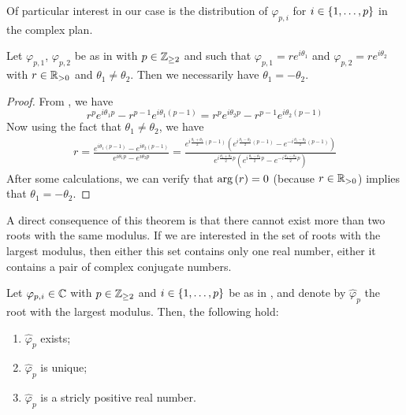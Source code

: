 \documentclass{article}
\begin{document}

    Of particular interest in our case is the distribution of $\varphi_{p, i}$ for $i \in \{1, \dots, p\}$ in the complex plan.

    \begin{theorem} \label{thm:one_two_rule}
      Let $\varphi_{p,1}$, $\varphi_{p,2}$ be as in  with $p \in \mathbb{Z}_{\geq 2}$ and such that
      $\varphi_{p,1} = r e^{i\theta_1}$ and $\varphi_{p,2} = r e^{i\theta_2}$ with $r \in \mathbb{R}_{>0}$ and $\theta_1 \neq \theta_2$. 
      Then we necessarily have $\theta_{1} = - \theta_{2}$.
    \end{theorem}

    \begin{proof}
      From , we have
      \begin{equation}
        r^p e^{i\theta_1p} - r^{p-1} e^{i\theta_1(p-1)}
        = r^p e^{i\theta_2p} - r^{p-1} e^{i\theta_2(p-1)}
      \end{equation}
      Now using the fact that $\theta_1 \neq \theta_2$, we have
      \begin{align}
        r = \frac{e^{i \theta_1 (p-1)} - e^{i \theta_2 (p-1)}}{e^{i \theta_1 p} - e^{i \theta_2 p}} = \frac{e^{i \frac{\theta_1 + \theta_2}{2}(p-1)} \left( e^{i \frac{\theta_1 - \theta_2}{2}(p-1)} - e^{-i \frac{\theta_1 - \theta_2}{2}(p-1)} \right)}
        {e^{i \frac{\theta_1 + \theta_2}{2}p} \left( e^{i \frac{\theta_1 - \theta_2}{2}p} - e^{-i \frac{\theta_1 - \theta_2}{2}p} \right)}
      \end{align}
      After some calculations, we can verify that $\textnormal{arg} \left(r\right) = 0$ (because $r \in \mathbb{R}_{>0}$) implies that $\theta_1 = -\theta_2$.
      
    \end{proof}

    \begin{remark}
      A direct consequence of this theorem is that there cannot exist more than two roots with the same modulus. If we are interested in 
      the set of roots with the largest modulus, then either this set contains only one real number, either it contains
      a pair of complex conjugate numbers.
    \end{remark}

    \begin{theorem} \label{thm:golden_number}
      Let $\varphi_{p, i} \in \mathbb C$ with $p \in \mathbb{Z}_{\geq 2}$ and $i \in \{1, \dots, p\}$ be as in , and denote by 
      $\hat{\varphi}_p$ the root with the largest modulus. Then, the following hold:
      \begin{enumerate}
        \item $\hat{\varphi}_p$ exists;
        \item $\hat{\varphi}_p$ is unique;
        \item $\hat{\varphi}_p$ is a stricly positive real number.
      \end{enumerate}
    \end{theorem}
\end{document}
